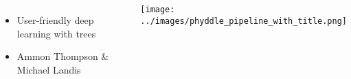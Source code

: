 \begin{frame}
    \begin{columns}

        \begin{minipage}[c][\frametextheight][c]{\columnwidth}
            \begin{itemize}
                \item User-friendly deep learning with trees
                \item Ammon Thompson \& Michael Landis 
            \end{itemize}
        \end{minipage}


        \begin{minipage}[c][\frametextheight][t]{\columnwidth}
            \begin{center}
                \texttt{[image: ../images/phyddle\_pipeline\_with\_title.png]}
            \end{center}
        \end{minipage}

    \end{columns}

\end{frame}
